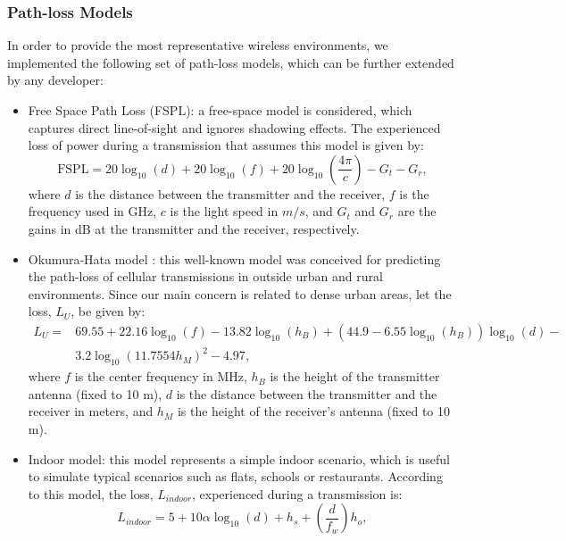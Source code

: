 \documentclass[a4paper]{article}
\begin{document}
		\subsubsection{Path-loss Models}
		In order to provide the most representative wireless environments, we implemented the following set of path-loss models, which can be further extended by any developer:
		\begin{itemize}
			\item Free Space Path Loss (FSPL): a free-space model is considered, which captures direct line-of-sight and ignores shadowing effects. The experienced loss of power during a transmission that assumes this model is given by:
			\begin{equation}
				\text{FSPL} = 20 \log_{10}(d) + 20 \log_{10}(f) + 20 \log_{10}(\frac{4\pi}{c}) - G_t - G_r,
				\nonumber
			\end{equation}
			where $d$ is the distance between the transmitter and the receiver, $f$ is the frequency used in GHz, $c$ is the light speed in $m/s$, and $G_t$ and $G_r$ are the gains in dB at the transmitter and the receiver, respectively.
			\item Okumura-Hata model \cite{hata1980empirical}: this well-known model was conceived for predicting the path-loss of cellular transmissions in outside urban and rural environments. Since our main concern is related to dense urban areas, let the loss, $L_U$, be given by: 
			\begin{equation}
			\begin{aligned}
				L_U =  &69.55 + 22.16 \log_{10}(f) - 13.82 \log_{10} (h_B) + (44.9 - 6.55 \log_{10}(h_B)) \log_{10}(d) - \\ 
				& 3.2 \log_{10}(11.7554 h_M)^2 - 4.97,
			\end{aligned}
			\nonumber
			\end{equation}
			where $f$ is the center frequency in MHz, $h_B$ is the height of the transmitter antenna (fixed to 10 m), $d$ is the distance between the transmitter and the receiver in meters, and $h_M$ is the height of the receiver's antenna (fixed to 10 m).
			\item Indoor model: this model represents a simple indoor scenario, which is useful to simulate typical scenarios such as flats, schools or restaurants. According to this model, the loss, $L_{indoor}$, experienced during a transmission is:		
			\begin{equation}
				L_{indoor} = 5 + 10 \alpha \log_{10}(d) + h_s + (\frac{d}{f_w}) h_o,
				\nonumber
			\end{equation}

\end{itemize}
\end{document}
